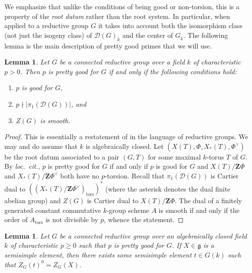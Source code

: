 \documentclass[11pt,reqno]{amsart}
\newtheorem{lemma}[theorem]{Lemma}
\theoremstyle{definition}
\renewcommand{\rm}{\mathrm}
\newcommand{\bZ}{{\mathbf Z}}
\newcommand{\sD}{{\mathscr D}}
\newcommand{\fg}{\mathfrak{g}}
\begin{document}
We emphasize that unlike the conditions of being good or non-torsion, this is a property of the \textit{root datum} rather than the root system. In particular, when applied to a reductive group $G$ it takes into account both the isomorphism class (not just the isogeny class) of $\sD(G)_{\overline{k}}$ and the center of $G_{\overline{k}}$. The following lemma is the main description of pretty good primes that we will use.

\begin{lemma}\label{lemma:characterization-of-pretty-good-primes}
Let $G$ be a connected reductive group over a field $k$ of characteristic $p > 0$. Then $p$ is pretty good for $G$ if and only if the following conditions hold:
\begin{enumerate}
    \item $p$ is good for $G$,
    \item $p \nmid |\pi_1(\sD(G))|$, and
    \item $Z(G)$ is smooth.
\end{enumerate}
\end{lemma}

\begin{proof}
This is essentially a restatement of \cite[Lem.\ 2.12(a)]{Herpel} in the language of reductive groups. We may and do assume that $k$ is algebraically closed. Let $(X(T), \Phi, X_*(T), \Phi^\vee)$ be the root datum associated to a pair $(G, T)$ for some maximal $k$-torus $T$ of $G$. By \textit{loc.\ cit.}, $p$ is pretty good for $G$ if and only if $p$ is good for $G$ and $X(T)/\bZ\Phi$ and $X_*(T)/\bZ\Phi^\vee$ both have no $p$-torsion. Recall that $\pi_1(\sD(G))$ is Cartier dual to $((X_*(T)/\bZ\Phi^\vee)_{\rm{tors}})^*$ (where the asterisk denotes the dual finite abelian group) and $Z(G)$ is Cartier dual to $X(T)/\bZ\Phi$. The dual of a finitely generated constant commutative $k$-group scheme $A$ is smooth if and only if the order of $A_{\rm{tors}}$ is not divisible by $p$, whence the statement.
\end{proof}

\begin{lemma}\label{lemma:semisimple-replacement}
Let $G$ be a connected reductive group over an algebraically closed field $k$ of characteristic $p \geq 0$ such that $p$ is pretty good for $G$. If $X \in \fg$ is a semisimple element, then there exists some semisimple element $t \in G(k)$ such that $Z_G(t)^0 = Z_G(X)$.
\end{lemma}
\end{document}
